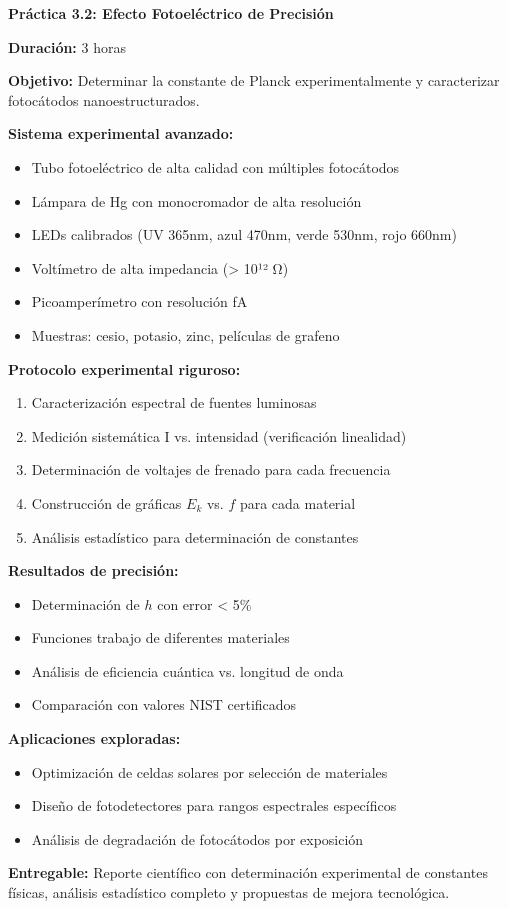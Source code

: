 \begin{practicabox}
	\textbf{Práctica 3.2: Efecto Fotoeléctrico de Precisión}
	
	\textbf{Duración:} 3 horas
	
	\textbf{Objetivo:} Determinar la constante de Planck experimentalmente y caracterizar fotocátodos nanoestructurados.
	
	\textbf{Sistema experimental avanzado:}
	\begin{itemize}
		\item Tubo fotoeléctrico de alta calidad con múltiples fotocátodos
		\item Lámpara de Hg con monocromador de alta resolución
		\item LEDs calibrados (UV 365nm, azul 470nm, verde 530nm, rojo 660nm)
		\item Voltímetro de alta impedancia (> 10¹² Ω)
		\item Picoamperímetro con resolución fA
		\item Muestras: cesio, potasio, zinc, películas de grafeno
	\end{itemize}
	
	\textbf{Protocolo experimental riguroso:}
	\begin{enumerate}
		\item Caracterización espectral de fuentes luminosas
		\item Medición sistemática I vs. intensidad (verificación linealidad)
		\item Determinación de voltajes de frenado para cada frecuencia
		\item Construcción de gráficas $E_k$ vs. $f$ para cada material
		\item Análisis estadístico para determinación de constantes
	\end{enumerate}
	
	\textbf{Resultados de precisión:}
	\begin{itemize}
		\item Determinación de $h$ con error < 5\%
		\item Funciones trabajo de diferentes materiales
		\item Análisis de eficiencia cuántica vs. longitud de onda
		\item Comparación con valores NIST certificados
	\end{itemize}
	
	\textbf{Aplicaciones exploradas:}
	\begin{itemize}
		\item Optimización de celdas solares por selección de materiales
		\item Diseño de fotodetectores para rangos espectrales específicos
		\item Análisis de degradación de fotocátodos por exposición
	\end{itemize}
	
	\textbf{Entregable:} Reporte científico con determinación experimental de constantes físicas, análisis estadístico completo y propuestas de mejora tecnológica.
\end{practicabox}

